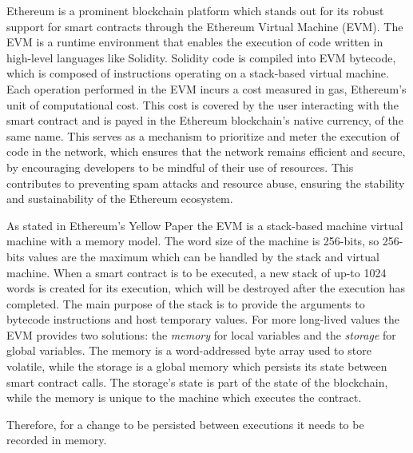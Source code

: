 Ethereum is a prominent blockchain platform which stands out for its robust
support for smart contracts through the Ethereum Virtual Machine (EVM). The
EVM is a runtime environment that enables the execution of code written in
high-level languages like Solidity. Solidity code is compiled into EVM 
bytecode, which is composed of instructions operating on a stack-based 
virtual machine. Each operation performed in the EVM incurs a cost measured 
in gas, Ethereum's unit of computational cost. This cost is covered by the 
user interacting with the smart contract and is payed in the Ethereum 
blockchain's native currency, of the same name. This serves as a mechanism 
to prioritize and meter the execution of code in the network, which ensures 
that the network remains efficient and secure, by encouraging developers to 
be mindful of their use of resources. This contributes to preventing spam 
attacks and resource abuse, ensuring the stability and sustainability of the 
Ethereum ecosystem.

As stated in Ethereum's Yellow Paper \cite{wood2014ethereum} the EVM is a 
stack-based machine virtual machine with a memory model. The word size of the
machine is 256-bits, so 256-bits values are the maximum which can be handled
by the stack and virtual machine. When a smart contract is to be executed, 
a new stack of up-to 1024 words is created for its execution, which will be 
destroyed after the execution has completed. The main purpose of the stack is
to provide the arguments to bytecode instructions and host temporary values.
For more long-lived values the EVM provides two solutions: the \emph{memory} for
local variables and the \emph{storage} for global variables. The memory is a 
word-addressed byte array used to store volatile, while the storage is a global
memory which persists its state between smart contract calls. The storage's
state is part of the state of the blockchain, while the memory is unique to
the machine which executes the contract.

Therefore, for a change to be persisted between executions it needs
to be recorded in memory.

